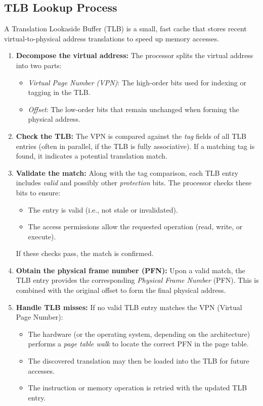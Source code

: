 \documentclass[../../compsys.tex]{subfiles}
\begin{document}
\subsection{TLB Lookup Process}
A Translation Lookaside Buffer (TLB) is a small, fast cache that stores recent virtual-to-physical address translations to speed up memory accesses. \\[9px]
\noindent
\begin{minipage}{0.45\textwidth}
\small
\begin{enumerate}
    \item \textbf{Decompose the virtual address:} 
    The processor splits the virtual address into two parts:
    \begin{itemize}
        \item \textit{Virtual Page Number (VPN)}: The high-order bits used for indexing or tagging in the TLB.
        \item \textit{Offset}: The low-order bits that remain unchanged when forming the physical address.
    \end{itemize}
    
    \item \textbf{Check the TLB:} The VPN is compared against the \emph{tag} fields of all TLB entries (often in parallel, if the TLB is fully associative). If a matching tag is found, it indicates a potential translation match.

    \item \textbf{Validate the match:}
    Along with the tag comparison, each TLB entry includes \emph{valid} and possibly other \emph{protection} bits. The processor checks these bits to ensure:
    \begin{itemize}
        \item The entry is valid (i.e., not stale or invalidated).
        \item The access permissions allow the requested operation (read, write, or execute).
    \end{itemize}
    If these checks pass, the match is confirmed.

    \item \textbf{Obtain the physical frame number (PFN):} Upon a valid match, the TLB entry provides the corresponding \emph{Physical Frame Number} (PFN). This is combined with the original offset to form the final physical address.

    \item \textbf{Handle TLB misses:}
    If no valid TLB entry matches the VPN (Virtual Page Number):
    \begin{itemize}
        \item The hardware (or the operating system, depending on the architecture) performs a \emph{page table walk} to locate the correct PFN in the page table.
        \item The discovered translation may then be loaded into the TLB for future accesses.
        \item The instruction or memory operation is retried with the updated TLB entry.
    \end{itemize}
\end{enumerate}
\end{minipage}%
\end{document}
